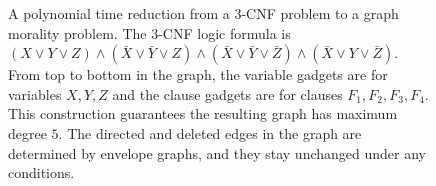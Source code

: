 \begin{figure}[H]
\caption{A polynomial time reduction from a 3-CNF problem to a graph morality problem. The 3-CNF logic formula is $(X \vee Y \vee Z)\wedge(\bar{X} \vee \bar{Y} \vee Z)\wedge(\bar{X} \vee \bar{Y} \vee \bar{Z})\wedge(\bar{X} \vee Y \vee \bar{Z})$. From top to bottom in the graph, the variable gadgets are for variables $X, Y, Z$ and the clause gadgets are for clauses $F_1,F_2,F_3,F_4$. This construction guarantees the resulting graph has maximum degree $5$. The directed and deleted edges in the graph are determined by envelope graphs, and they stay unchanged under any conditions.}
\label{fg:3cnf_partial_dir}
\end{figure}


